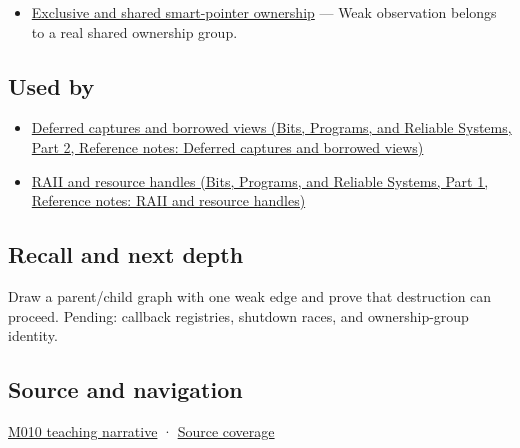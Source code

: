 \hypertarget{appendix-b9548675eb2b-prerequisites}{}

\begin{itemize}
\tightlist
\item
  \hyperref[appendix-51602cabe815]{Exclusive and shared smart-pointer ownership} --- Weak observation belongs to a real shared ownership group.
\end{itemize}

\subsection{Used by}\label{appendix-b9548675eb2b-used-by}

\hypertarget{appendix-b9548675eb2b-used-by}{}

\begin{itemize}
\tightlist
\item
  \href{../01-Bits-Programs-and-Reliable-Systems-P02/main.pdf\#nameddest=appendix-aea529eb5175}{Deferred captures and borrowed views (Bits, Programs, and Reliable Systems, Part 2, Reference notes: Deferred captures and borrowed views)}
\item
  \href{../01-Bits-Programs-and-Reliable-Systems-P01/main.pdf\#nameddest=appendix-69739d3ab49b}{RAII and resource handles (Bits, Programs, and Reliable Systems, Part 1, Reference notes: RAII and resource handles)}
\end{itemize}

\subsection{Recall and next depth}\label{appendix-b9548675eb2b-recall-and-next-depth}

\hypertarget{appendix-b9548675eb2b-recall-and-next-depth}{}

Draw a parent/child graph with one weak edge and prove that destruction can proceed. Pending: callback registries, shutdown races, and ownership-group identity.

\subsection{Source and navigation}\label{appendix-b9548675eb2b-source-and-navigation}

\hypertarget{appendix-b9548675eb2b-source-and-navigation}{}

\hyperref[01-foundations-i-ch004-weak-observation-breaks-cycles-without-pretending-an-object-is-alive]{M010 teaching narrative} · \hyperref[appendix-fd090d982a15-m010---parts-148-160]{Source coverage}
